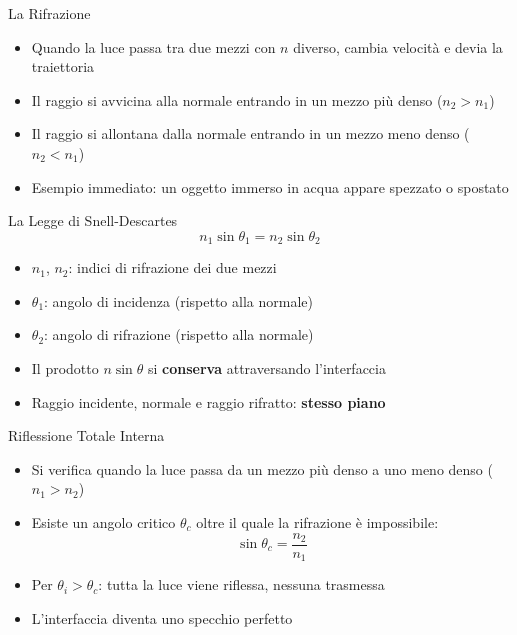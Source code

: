 \begin{frame}{La Rifrazione}
    \begin{itemize}
        \item Quando la luce passa tra due mezzi con $n$ diverso, cambia velocità e devia la traiettoria
        \item Il raggio si avvicina alla normale entrando in un mezzo più denso ($n_2 > n_1$)
        \item Il raggio si allontana dalla normale entrando in un mezzo meno denso ($n_2 < n_1$)
        \item Esempio immediato: un oggetto immerso in acqua appare spezzato o spostato
    \end{itemize}
\end{frame}


\begin{frame}{La Legge di Snell-Descartes}
    $$n_1 \sin\theta_1 = n_2 \sin\theta_2$$
    \begin{itemize}
        \item $n_1$, $n_2$: indici di rifrazione dei due mezzi
        \item $\theta_1$: angolo di incidenza (rispetto alla normale)
        \item $\theta_2$: angolo di rifrazione (rispetto alla normale)
        \item Il prodotto $n \sin\theta$ si \textbf{conserva} attraversando l'interfaccia
        \item Raggio incidente, normale e raggio rifratto: \textbf{stesso piano}
    \end{itemize}
\end{frame}



\begin{frame}{Riflessione Totale Interna}
    \begin{itemize}
        \item  Si verifica quando la luce passa da un mezzo più denso a uno meno denso ($n_1 > n_2$)
        \item Esiste un angolo critico $\theta_c$ oltre il quale la rifrazione è impossibile:
        $$\sin\theta_c = \frac{n_2}{n_1}$$
        \item Per $\theta_i > \theta_c$: tutta la luce viene riflessa, nessuna trasmessa
        \item L'interfaccia diventa uno specchio perfetto
    \end{itemize}
\end{frame}





